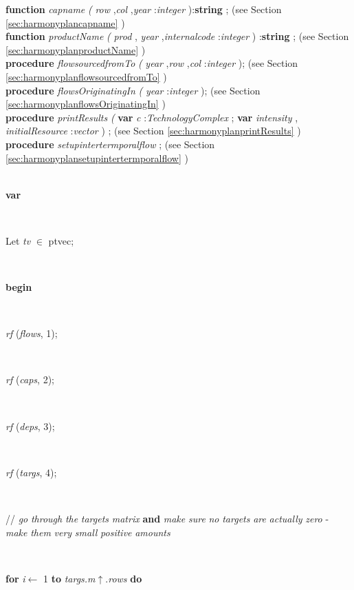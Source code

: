\documentclass[10pt, a4paper]{article}
\begin{document}
\begin{tabbing}
\<\textsf{\textbf{function}  \textit{capname} \textit{(} \textit{row} ,\textit{col} ,\textit{year} :\textit{integer} ):\textbf{string} ;} (see Section \ref{sec:harmonyplancapname} )\\
\<\textsf{\textbf{function}  \textit{productName} \textit{(} \textit{prod} ,  \textit{year} ,\textit{internalcode} :\textit{integer} ) :\textbf{string} ;} (see Section \ref{sec:harmonyplanproductName} )\\
\<\textsf{\textbf{procedure}  \textit{flowsourcedfromTo} \textit{(} \textit{year} ,\textit{row} ,\textit{col} :\textit{integer} );} (see Section \ref{sec:harmonyplanflowsourcedfromTo} )\\
\<\textsf{\textbf{procedure}  \textit{flowsOriginatingIn} \textit{(} \textit{year} :\textit{integer} );} (see Section \ref{sec:harmonyplanflowsOriginatingIn} )\\
\<\textsf{\textbf{procedure}  \textit{printResults} \textit{(} \textbf{var}  \textit{c} :\textit{TechnologyComplex} ; \textbf{var}  \textit{intensity} ,  \textit{initialResource} :\textit{vector} ) ;} (see Section \ref{sec:harmonyplanprintResults} )\\
\<\textsf{\textbf{procedure}  \textit{setupintertermporalflow} ;} (see Section \ref{sec:harmonyplansetupintertermporalflow} )\\
\\
\<\parbox{14cm}{\textsf{\textbf{var} }}\\
\parbox{14cm}{\textsf{Let \textit{tv} $\in$ ptvec;}}\\
\-\<\+\parbox{14cm}{\textsf{\textbf{begin} }}\\
\parbox{14cm}{\textsf{\textit{rf} (\textit{flows}, 1)}; }\\
\parbox{14cm}{\textsf{\textit{rf} (\textit{caps}, 2)}; }\\
\parbox{14cm}{\textsf{\textit{rf} (\textit{deps}, 3)}; }\\
\parbox{14cm}{\textsf{\textit{rf} (\textit{targs}, 4)}; }\\
\parbox{14cm}{\textsf{// \textit{go}  \textit{through}  \textit{the}  \textit{targets}  \textit{matrix}  \textbf{and}  \textit{make}  \textit{sure}  \textit{no}  \textit{targets}  \textit{are}  \textit{actually}  \textit{zero}  - \textit{make}  \textit{them}  \textit{very}  \textit{small}  \textit{positive}  \textit{amounts} }}\\
\+\parbox{14cm}{\textsf {\textbf {for } \textsf{\textit{i}$\leftarrow$ 1} \textbf{ to } \textsf{\textit{targs.m}$\uparrow$.\textit{rows}} \textbf{ do } }}\\

\end{tabbing}
\end{document}
